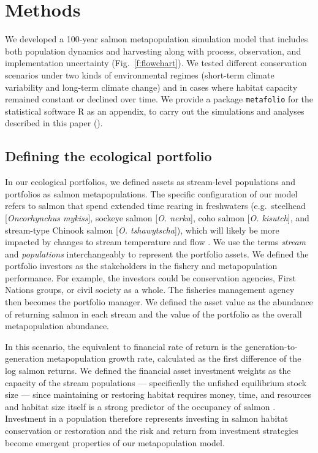 \section{Methods}

We developed a 100-year salmon metapopulation simulation model that includes both population dynamics and harvesting along with process, observation, and implementation uncertainty (Fig.~\ref{f:flowchart}). We tested different conservation scenarios under two kinds of environmental regimes (short-term climate variability and long-term climate change) and in cases where habitat capacity remained constant or declined over time. We provide a package \texttt{metafolio} \citep{metafoliopkg} for the statistical software \textsf{R} \citep{r2013} as an appendix, to carry out the simulations and analyses described in this paper (\somR).

\subsection{Defining the ecological portfolio}\label{defining-the-ecological-portfolio}

In our ecological portfolios, we defined assets as stream-level populations and portfolios as salmon metapopulations. The specific configuration of our model refers to salmon that spend extended time rearing in freshwaters (e.g.~steelhead {[}\emph{Oncorhynchus mykiss}{]}, sockeye salmon {[}\emph{O. nerka}{]}, coho salmon {[}\emph{O. kisutch}{]}, and stream-type Chinook salmon {[}\emph{O. tshawytscha}{]}), which will likely be more impacted by changes to stream temperature and flow \citep{mantua2010}. We use the terms \emph{stream} and \emph{populations} interchangeably to represent the portfolio assets. We defined the portfolio investors as the stakeholders in the fishery and metapopulation performance. For example, the investors could be conservation agencies, First Nations groups, or civil society as a whole. The fisheries management agency then becomes the portfolio manager. We defined the asset value as the abundance of returning salmon in each stream and the value of the portfolio as the overall metapopulation abundance.

In this scenario, the equivalent to financial rate of return is the generation-to-generation metapopulation growth rate, calculated as the first difference of the log salmon returns. We defined the financial asset investment weights as the capacity of the stream populations --- specifically the unfished equilibrium stock size --- since maintaining or restoring habitat requires money, time, and resources and habitat size itself is a strong predictor of the occupancy of salmon \citep{isaak2007}. Investment in a population therefore represents investing in salmon habitat conservation or restoration and the risk and return from investment strategies become emergent properties of our metapopulation model.

